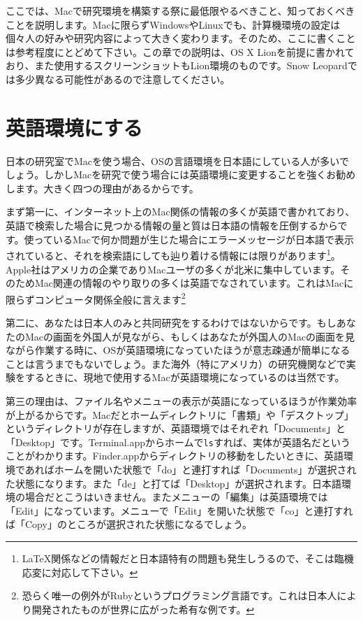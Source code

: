 ここでは、Macで研究環境を構築する祭に最低限やるべきこと、知っておくべきことを説明します。Macに限らずWindowsやLinuxでも、計算機環境の設定は個々人の好みや研究内容によって大きく変わります。そのため、ここに書くことは参考程度にとどめて下さい。この章での説明は、OS X Lionを前提に書かれており、また使用するスクリーンショットもLion環境のものです。Snow Leopardでは多少異なる可能性があるので注意してください。
\section{英語環境にする}
日本の研究室でMacを使う場合、OSの言語環境を日本語にしている人が多いでしょう。しかしMacを研究で使う場合には英語環境に変更することを強くお勧めします。大きく四つの理由があるからです。

まず第一に、インターネット上のMac関係の情報の多くが英語で書かれており、英語で検索した場合に見つかる情報の量と質は日本語の情報を圧倒するからです。使っているMacで何か問題が生じた場合にエラーメッセージが日本語で表示されていると、それを検索語にしても辿り着ける情報には限りがあります\footnote{\LaTeX 関係などの情報だと日本語特有の問題も発生しうるので、そこは臨機応変に対応して下さい。}。Apple社はアメリカの企業でありMacユーザの多くが北米に集中しています。そのためMac関連の情報のやり取りの多くは英語でなされています。これはMacに限らずコンピュータ関係全般に言えます\footnote{恐らく唯一の例外がRubyというプログラミング言語です。これは日本人により開発されたものが世界に広がった希有な例です。}

第二に、あなたは日本人のみと共同研究をするわけではないからです。もしあなたのMacの画面を外国人が見ながら、もしくはあなたが外国人のMacの画面を見ながら作業する時に、OSが英語環境になっていたほうが意志疎通が簡単になることは言うまでもないでしょう。また海外（特にアメリカ）の研究機関などで実験をするときに、現地で使用するMacが英語環境になっているのは当然です。

第三の理由は、ファイル名やメニューの表示が英語になっているほうが作業効率が上がるからです。Macだとホームディレクトリに「書類」や「デスクトップ」というディレクトリが存在しますが、英語環境ではそれぞれ「Documents」と「Desktop」です。Terminal.appからホームで\texttt{ls}すれば、実体が英語名だということがわかります。Finder.appからディレクトリの移動をしたいときに、英語環境であればホームを開いた状態で「do」と連打すれば「Documents」が選択された状態になります。また「de」と打てば「Desktop」が選択されます。日本語環境の場合だとこうはいきません。またメニューの「編集」は英語環境では「Edit」になっています。メニューで「Edit」を開いた状態で「co」と連打すれば「Copy」のところが選択された状態になるでしょう。

